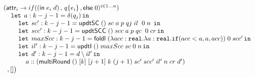 \begin{figure}
\[\begin{array}{l}
 ( \mathsf{attr}_i \to if( (\mathsf{in}\; e_i \; d) \, , \, q\{e_i\} \,, \mathsf{else}\; 0)^{i \in 1\dots n} )\\
 \hspace{0.4cm} \mathop{\mathtt{let}} \; a: k - j - 1 = \delta (q_j)  \mathop{ \mathtt{in}} \\
 \hspace{0.8cm} \mathop{\mathtt{let}} \; sc': k - j - 1 =  \mathsf{updtSC} \; () \; sc  \; a \; p
                \; qj \; il \;  \; 0 \;  n \;  \mathop{ \mathtt{in}} \\
 \hspace{0.8cm} \mathop{\mathtt{let}} \; scc': k - j - 1 =  \mathsf{updtSCC} \; () \; scc \; a \; p
                \; qc \;  \; 0 \;  cr \mathop{ \mathtt{in}} \\
 \hspace{0.8cm} \mathop{\mathtt{let}} \; maxScc: k - j - 1 =  \mathsf{foldl} \; 
                (\lambda acc : \mathtt{real}. \lambda a: \mathtt{real}. 
                \mathtt{if} ( acc < a, a, acc)) \; 0 \; scc' \mathop{ \mathtt{in}} \\
 \hspace{0.8cm} \mathop{\mathtt{let}} \; il': k - j - 1 =  \mathsf{updtI}  \; () \; maxScc \; sc
                \; 0 \; n  \mathop{ \mathtt{in}} \\
 \hspace{0.8cm} \mathop{\mathtt{let}} \; d': k - j - 1 =  d \setminus il' \mathop{ \mathtt{in}} \\
 \hspace{1.2cm} a :: (\mathsf{multiRound} \; () \; [k] \; [j + 1]  
                 \; k \; (j+1) \; sc' \; scc' \; il'
                 \; n \; cr \; d')\\ 
 \hspace{0.2cm} , []  \big)
\end{array}
\]

\end{figure}



